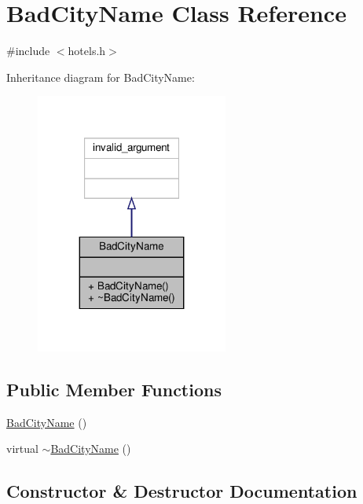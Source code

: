 \hypertarget{class_bad_city_name}{}\section{Bad\+City\+Name Class Reference}
\label{class_bad_city_name}


{\ttfamily \#include $<$hotels.\+h$>$}



Inheritance diagram for Bad\+City\+Name\+:\nopagebreak
\begin{figure}[H]
\begin{center}
\leavevmode
\includegraphics[width=179pt]{class_bad_city_name__inherit__graph}
\end{center}
\end{figure}
\subsection*{Public Member Functions}
\begin{DoxyCompactItemize}
\item 
\hyperlink{class_bad_city_name_a8e630c7dcfd5b617e93453fdb925146a}{Bad\+City\+Name} ()
\item 
virtual \hyperlink{class_bad_city_name_aaa7bda78c16c0f8ef6ebee0c68c03c29}{$\sim$\+Bad\+City\+Name} ()
\end{DoxyCompactItemize}


\subsection{Constructor \& Destructor Documentation}
\mbox{\label{class_bad_city_name_a8e630c7dcfd5b617e93453fdb925146a}} 
